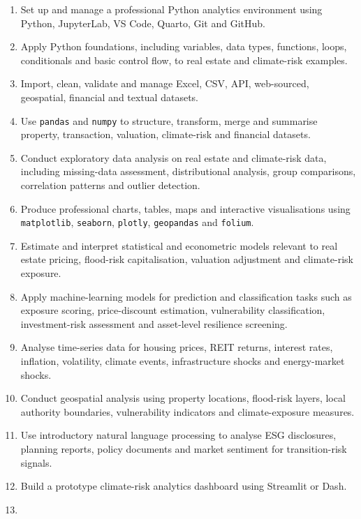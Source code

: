 \documentclass[
  a4paper,
]{article}
\providecommand{\tightlist}{%
  \setlength{\itemsep}{0pt}\setlength{\parskip}{0pt}}
\begin{document}
\begin{enumerate}
\def\labelenumi{\arabic{enumi}.}
\tightlist
\item
  Set up and manage a professional Python analytics environment using
  Python, JupyterLab, VS Code, Quarto, Git and GitHub.
\item
  Apply Python foundations, including variables, data types, functions,
  loops, conditionals and basic control flow, to real estate and
  climate-risk examples.
\item
  Import, clean, validate and manage Excel, CSV, API, web-sourced,
  geospatial, financial and textual datasets.
\item
  Use \texttt{pandas} and \texttt{numpy} to structure, transform, merge
  and summarise property, transaction, valuation, climate-risk and
  financial datasets.
\item
  Conduct exploratory data analysis on real estate and climate-risk
  data, including missing-data assessment, distributional analysis,
  group comparisons, correlation patterns and outlier detection.
\item
  Produce professional charts, tables, maps and interactive
  visualisations using \texttt{matplotlib}, \texttt{seaborn},
  \texttt{plotly}, \texttt{geopandas} and \texttt{folium}.
\item
  Estimate and interpret statistical and econometric models relevant to
  real estate pricing, flood-risk capitalisation, valuation adjustment
  and climate-risk exposure.
\item
  Apply machine-learning models for prediction and classification tasks
  such as exposure scoring, price-discount estimation, vulnerability
  classification, investment-risk assessment and asset-level resilience
  screening.
\item
  Analyse time-series data for housing prices, REIT returns, interest
  rates, inflation, volatility, climate events, infrastructure shocks
  and energy-market shocks.
\item
  Conduct geospatial analysis using property locations, flood-risk
  layers, local authority boundaries, vulnerability indicators and
  climate-exposure measures.
\item
  Use introductory natural language processing to analyse ESG
  disclosures, planning reports, policy documents and market sentiment
  for transition-risk signals.
\item
  Build a prototype climate-risk analytics dashboard using Streamlit or
  Dash.
\item

\end{enumerate}
\end{document}
